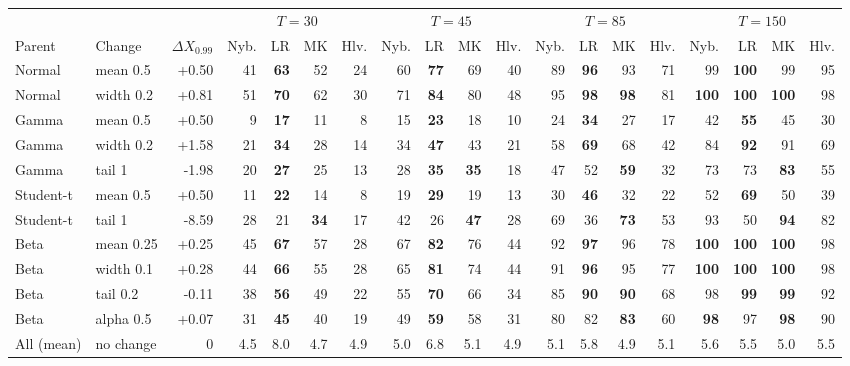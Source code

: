\begin{tabular}{llrrrrrrrrrrrrrrrrr}
\toprule
 & & & \multicolumn{4}{c}{$T=30$} & \multicolumn{4}{c}{$T=45$} & \multicolumn{4}{c}{$T=85$} & \multicolumn{4}{c}{$T=150$} \\
\cmidrule(lr){4-7} \cmidrule(lr){8-11} \cmidrule(lr){12-15} \cmidrule(lr){16-19}
Parent & Change & $\Delta X_{0.99}$ & Nyb. & LR & MK & Hlv. & Nyb. & LR & MK & Hlv. & Nyb. & LR & MK & Hlv. & Nyb. & LR & MK & Hlv. \\
\midrule
Normal & mean 0.5 & +0.50 & 41 & \textbf{63} & 52 & 24 & 60 & \textbf{77} & 69 & 40 & 89 & \textbf{96} & 93 & 71 & 99 & \textbf{100} & 99 & 95 \\
Normal & width 0.2 & +0.81 & 51 & \textbf{70} & 62 & 30 & 71 & \textbf{84} & 80 & 48 & 95 & \textbf{98} & \textbf{98} & 81 & \textbf{100} & \textbf{100} & \textbf{100} & 98 \\
Gamma & mean 0.5 & +0.50 & 9 & \textbf{17} & 11 & 8 & 15 & \textbf{23} & 18 & 10 & 24 & \textbf{34} & 27 & 17 & 42 & \textbf{55} & 45 & 30 \\
Gamma & width 0.2 & +1.58 & 21 & \textbf{34} & 28 & 14 & 34 & \textbf{47} & 43 & 21 & 58 & \textbf{69} & 68 & 42 & 84 & \textbf{92} & 91 & 69 \\
Gamma & tail 1 & -1.98 & 20 & \textbf{27} & 25 & 13 & 28 & \textbf{35} & \textbf{35} & 18 & 47 & 52 & \textbf{59} & 32 & 73 & 73 & \textbf{83} & 55 \\
Student-t & mean 0.5 & +0.50 & 11 & \textbf{22} & 14 & 8 & 19 & \textbf{29} & 19 & 13 & 30 & \textbf{46} & 32 & 22 & 52 & \textbf{69} & 50 & 39 \\
Student-t & tail 1 & -8.59 & 28 & 21 & \textbf{34} & 17 & 42 & 26 & \textbf{47} & 28 & 69 & 36 & \textbf{73} & 53 & 93 & 50 & \textbf{94} & 82 \\
Beta & mean 0.25 & +0.25 & 45 & \textbf{67} & 57 & 28 & 67 & \textbf{82} & 76 & 44 & 92 & \textbf{97} & 96 & 78 & \textbf{100} & \textbf{100} & \textbf{100} & 98 \\
Beta & width 0.1 & +0.28 & 44 & \textbf{66} & 55 & 28 & 65 & \textbf{81} & 74 & 44 & 91 & \textbf{96} & 95 & 77 & \textbf{100} & \textbf{100} & \textbf{100} & 98 \\
Beta & tail 0.2 & -0.11 & 38 & \textbf{56} & 49 & 22 & 55 & \textbf{70} & 66 & 34 & 85 & \textbf{90} & \textbf{90} & 68 & 98 & \textbf{99} & \textbf{99} & 92 \\
Beta & alpha 0.5 & +0.07 & 31 & \textbf{45} & 40 & 19 & 49 & \textbf{59} & 58 & 31 & 80 & 82 & \textbf{83} & 60 & \textbf{98} & 97 & \textbf{98} & 90 \\
\midrule
All (mean) & no change & 0 & 4.5 & 8.0 & 4.7 & 4.9 & 5.0 & 6.8 & 5.1 & 4.9 & 5.1 & 5.8 & 4.9 & 5.1 & 5.6 & 5.5 & 5.0 & 5.5 \\
\bottomrule
\end{tabular}
